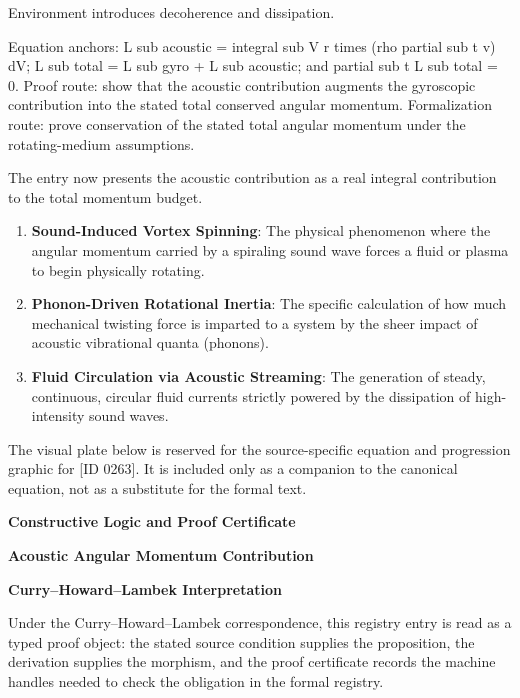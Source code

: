 Environment introduces decoherence and dissipation.

Equation anchors: L sub acoustic = integral sub V r times (rho partial sub t v) dV; L sub total = L sub gyro + L sub acoustic; and partial sub t L sub total = 0. Proof route: show that the acoustic contribution augments the gyroscopic contribution into the stated total conserved angular momentum. Formalization route: prove conservation of the stated total angular momentum under the rotating-medium assumptions.

The entry now presents the acoustic contribution as a real integral contribution to the total momentum budget.
\endgroup

\begin{enumerate}[leftmargin=1.6em,itemsep=6pt,topsep=4pt]
\item \textbf{Sound-Induced Vortex Spinning}: The physical phenomenon where the angular momentum carried by a spiraling sound wave forces a fluid or plasma to begin physically rotating.
\item \textbf{Phonon-Driven Rotational Inertia}: The specific calculation of how much mechanical twisting force is imparted to a system by the sheer impact of acoustic vibrational quanta (phonons).
\item \textbf{Fluid Circulation via Acoustic Streaming}: The generation of steady, continuous, circular fluid currents strictly powered by the dissipation of high-intensity sound waves.
\end{enumerate}

\begingroup\footnotesize\sloppy
The visual plate below is reserved for the source-specific equation and progression graphic for [ID 0263]. It is included only as a companion to the canonical equation, not as a substitute for the formal text.
\par\endgroup
\ifTZPDarkEdition
{}
\fi

\clearpage
\begingroup\tzpsupportsetup
\noindent\textbf{\fontsize{10.8pt}{12.8pt}\selectfont [ID 0263] Constructive Logic and Proof Certificate}\par
\noindent\textbf{\fontsize{10pt}{12pt}\selectfont Acoustic Angular Momentum Contribution}\par
\vspace{0.45em}
\begingroup
\footnotesize
\setlength{\parskip}{0.22em}
\setlength{\parindent}{0pt}
\noindent\textbf{Curry--Howard--Lambek Interpretation}\par
Under the Curry--Howard--Lambek correspondence, this registry entry is read as a typed proof
object: the stated source condition supplies the proposition, the derivation supplies the
morphism, and the proof certificate records the machine handles needed to check the obligation
in the formal registry.

